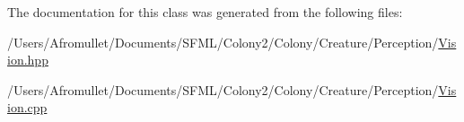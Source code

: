The documentation for this class was generated from the following files\+:\begin{DoxyCompactItemize}
\item 
/\+Users/\+Afromullet/\+Documents/\+S\+F\+M\+L/\+Colony2/\+Colony/\+Creature/\+Perception/\mbox{\hyperlink{_vision_8hpp}{Vision.\+hpp}}\item 
/\+Users/\+Afromullet/\+Documents/\+S\+F\+M\+L/\+Colony2/\+Colony/\+Creature/\+Perception/\mbox{\hyperlink{_vision_8cpp}{Vision.\+cpp}}\end{DoxyCompactItemize}
